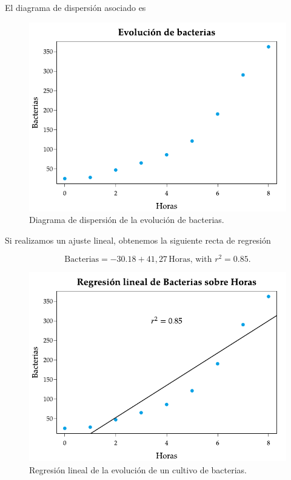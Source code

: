 \documentclass[
  a4paper,
]{scrreport}
\theoremstyle{plain}
\theoremstyle{definition}
\theoremstyle{definition}
\theoremstyle{remark}
\begin{document}
El diagrama de dispersión asociado es

\begin{figure}[H]

{\centering \includegraphics[width=6.25in,height=\textheight]{img/regresion/evolucion_bacterias.pdf}

}

\caption{Diagrama de dispersión de la evolución de bacterias.}

\end{figure}%

Si realizamos un ajuste lineal, obtenemos la siguiente recta de
regresión

\[\mbox{Bacterias} = -30.18+41,27\,\mbox{Horas, with } r^2=0.85.\]

\begin{figure}[H]

{\centering \includegraphics[width=6.25in,height=\textheight]{img/regresion/regresion_lineal_bacterias.pdf}

}

\caption{Regresión lineal de la evolución de un cultivo de bacterias.}

\end{figure}%
\end{document}
